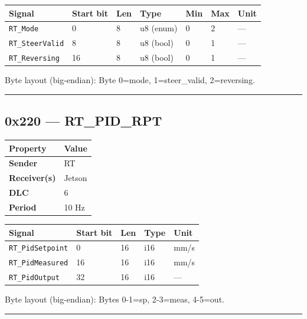 \documentclass[12pt,a4paper,oneside]{report}
\begin{document}
\begin{longtable}[]{@{}lllllll@{}}
\toprule\noalign{}
Signal & Start bit & Len & Type & Min & Max & Unit \\
\midrule\noalign{}
\endhead
\bottomrule\noalign{}
\endlastfoot
\texttt{RT\_Mode} & 0 & 8 & u8 (enum) & 0 & 2 & --- \\
\texttt{RT\_SteerValid} & 8 & 8 & u8 (bool) & 0 & 1 & --- \\
\texttt{RT\_Reversing} & 16 & 8 & u8 (bool) & 0 & 1 & --- \\
\end{longtable}

Byte layout (big-endian): Byte 0=mode, 1=steer\_valid, 2=reversing.

\begin{center}\rule{0.5\linewidth}{0.5pt}\end{center}

\subsection{0x220 --- RT\_PID\_RPT}\label{x220-rt_pid_rpt}

\begin{longtable}[]{@{}ll@{}}
\toprule\noalign{}
Property & Value \\
\midrule\noalign{}
\endhead
\bottomrule\noalign{}
\endlastfoot
\textbf{Sender} & RT \\
\textbf{Receiver(s)} & Jetson \\
\textbf{DLC} & 6 \\
\textbf{Period} & 10 Hz \\
\end{longtable}

\begin{longtable}[]{@{}lllll@{}}
\toprule\noalign{}
Signal & Start bit & Len & Type & Unit \\
\midrule\noalign{}
\endhead
\bottomrule\noalign{}
\endlastfoot
\texttt{RT\_PidSetpoint} & 0 & 16 & i16 & mm/s \\
\texttt{RT\_PidMeasured} & 16 & 16 & i16 & mm/s \\
\texttt{RT\_PidOutput} & 32 & 16 & i16 & --- \\
\end{longtable}

Byte layout (big-endian): Bytes 0-1=sp, 2-3=meas, 4-5=out.

\begin{center}\rule{0.5\linewidth}{0.5pt}\end{center}
\end{document}
